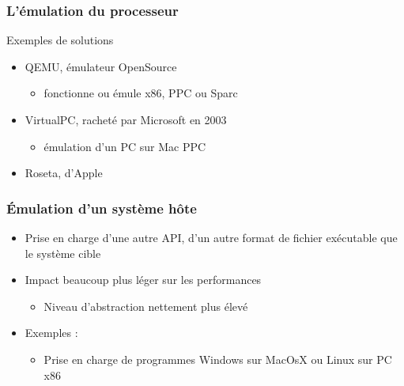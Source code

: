 \begin{frame}
\frametitle{L’émulation du processeur}
\begin{exampleblock}{Exemples de solutions}
\begin{itemize}
\item QEMU, émulateur OpenSource
\begin{itemize}
\item fonctionne ou émule x86, PPC ou Sparc
\end{itemize}
\item VirtualPC, racheté par Microsoft en 2003
\begin{itemize}
\item émulation d'un PC sur Mac PPC
\end{itemize}
\item Roseta, d'Apple
\end{itemize}
\end{exampleblock}
\end{frame}

\begin{frame}
\frametitle{Émulation d'un système hôte}
\begin{itemize}
\item Prise en charge d'une autre API, d'un autre format de fichier exécutable que le système cible
\item Impact beaucoup plus léger sur les performances
\begin{itemize}
\item Niveau d'abstraction nettement plus élevé
\end{itemize}
\item Exemples : 
\begin{itemize}
\item Prise en charge de programmes Windows sur MacOsX ou Linux sur PC x86
\end{itemize}
\end{itemize}
\end{frame}

